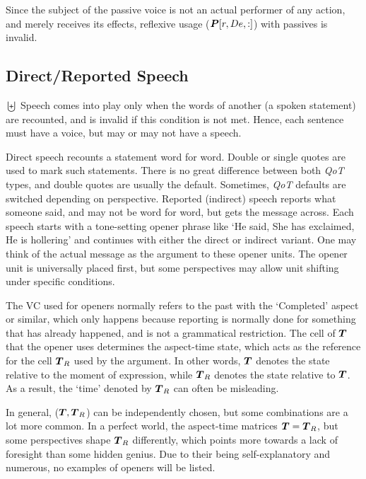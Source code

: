 Since the subject of the passive voice is not an actual performer of any action, and merely receives its effects, reflexive usage ($\boldsymbol{P}[r,De,:]$) with passives is invalid.
\subsection{Direct/Reported Speech}
$\biguplus$ Speech comes into play only when the words of another (a spoken statement) are recounted, and is invalid if this condition is not met. Hence, each sentence must have a voice, but may or may not have a speech.

Direct speech recounts a  statement word for word. Double  or single quotes are used to mark such statements. There is no great difference between both \textit{QoT} types, and double  quotes are usually the default. Sometimes,  \textit{QoT} defaults are switched depending on perspective. Reported (indirect) speech reports what someone  said, and may not be word for word, but gets the message across. Each speech starts with a tone-setting opener phrase like `He said, She has exclaimed, He is hollering' and continues with either the direct or indirect variant. One may think of the actual message as the argument to these opener units. The  opener unit is universally placed first, but  some perspectives may allow unit shifting under specific conditions.

The VC used for openers normally refers to the past with the `Completed' aspect or similar, which only happens because reporting is normally done for something that has already happened, and is not a grammatical restriction. The cell of $\boldsymbol{T}$ that  the opener uses determines the aspect-time state, which acts as the reference for the cell $\boldsymbol{T}_R$ used by the argument. In other words, $\boldsymbol{T}$ denotes the state relative to the moment of expression, while $\boldsymbol{T}_R$ denotes the state relative to $\boldsymbol{T}$. As a result, the `time' denoted by $\boldsymbol{T}_R$ can often be misleading.

In general, ($\boldsymbol{T}, \boldsymbol{T}_R$) can be independently chosen, but some combinations are a lot more common. In a perfect world, the aspect-time matrices $\boldsymbol{T}=\boldsymbol{T}_R$, but some perspectives shape $\boldsymbol{T}_R$  differently, which points more towards a lack of foresight than some hidden genius. Due to their being self-explanatory and numerous, no examples of openers will be listed.

